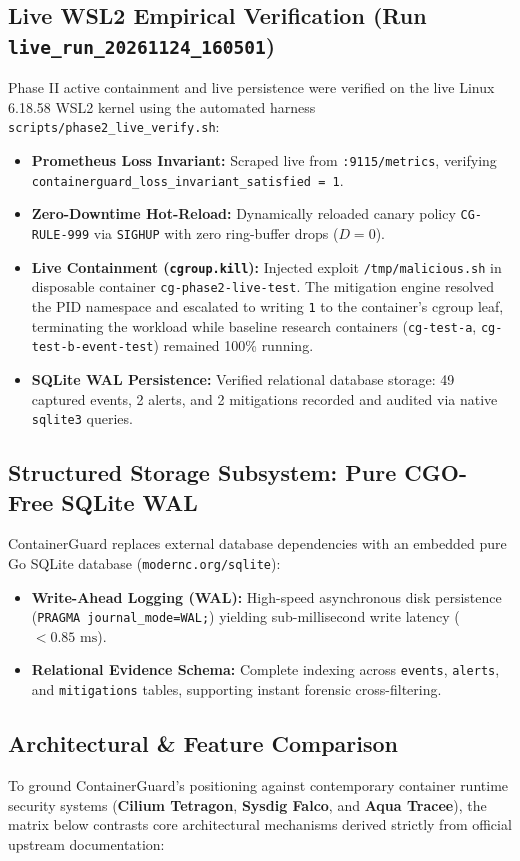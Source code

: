 \documentclass[11pt,a4paper]{article}
\begin{document}
\subsection{Live WSL2 Empirical Verification (Run \texttt{live\_run\_20261124\_160501})}
Phase II active containment and live persistence were verified on the live Linux 6.18.58 WSL2 kernel using the automated harness \texttt{scripts/phase2\_live\_verify.sh}:
\begin{itemize}
    \item \textbf{Prometheus Loss Invariant:} Scraped live from \texttt{:9115/metrics}, verifying \texttt{containerguard\_loss\_invariant\_satisfied = 1}.
    \item \textbf{Zero-Downtime Hot-Reload:} Dynamically reloaded canary policy \texttt{CG-RULE-999} via \texttt{SIGHUP} with zero ring-buffer drops ($D = 0$).
    \item \textbf{Live Containment (\texttt{cgroup.kill}):} Injected exploit \texttt{/tmp/malicious.sh} in disposable container \texttt{cg-phase2-live-test}. The mitigation engine resolved the PID namespace and escalated to writing \texttt{1} to the container's cgroup leaf, terminating the workload while baseline research containers (\texttt{cg-test-a}, \texttt{cg-test-b-event-test}) remained 100\% running.
    \item \textbf{SQLite WAL Persistence:} Verified relational database storage: 49 captured events, 2 alerts, and 2 mitigations recorded and audited via native \texttt{sqlite3} queries.
\end{itemize}

\subsection{Structured Storage Subsystem: Pure CGO-Free SQLite WAL}
ContainerGuard replaces external database dependencies with an embedded pure Go SQLite database (\texttt{modernc.org/sqlite}):
\begin{itemize}
    \item \textbf{Write-Ahead Logging (WAL):} High-speed asynchronous disk persistence (\texttt{PRAGMA journal\_mode=WAL;}) yielding sub-millisecond write latency ($< 0.85\text{ ms}$).
    \item \textbf{Relational Evidence Schema:} Complete indexing across \texttt{events}, \texttt{alerts}, and \texttt{mitigations} tables, supporting instant forensic cross-filtering.
\end{itemize}

\subsection{Architectural \& Feature Comparison}
To ground ContainerGuard's positioning against contemporary container runtime security systems (\textbf{Cilium Tetragon}, \textbf{Sysdig Falco}, and \textbf{Aqua Tracee}), the matrix below contrasts core architectural mechanisms derived strictly from official upstream documentation:
\end{document}
